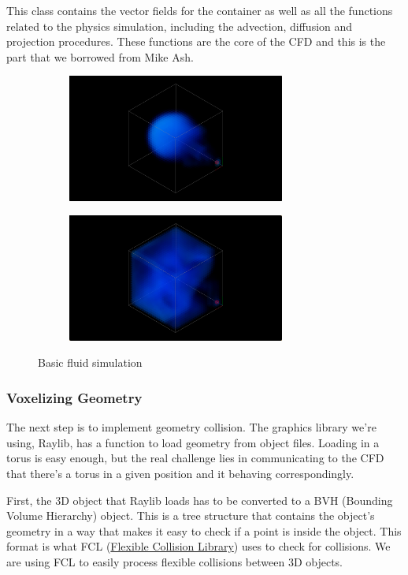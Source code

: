 \documentclass[a4paper,12pt,titlepage]{article}
\begin{document}
This class contains the vector fields for the container as well as all the
functions related to the physics simulation, including the advection, diffusion
and projection procedures. These functions are the core of the CFD and
this is the part that we borrowed from Mike Ash.

\begin{figure}[H]
    \centering
    \begin{subfigure}[t]{0.45\textwidth}
        \centering
        \includegraphics[height=1.65in]{resources/core1.png}
    \end{subfigure}
    \hfill
    \begin{subfigure}[t]{0.45\textwidth}
        \centering
        \includegraphics[height=1.65in]{resources/core2.png}
    \end{subfigure}
	\caption{Basic fluid simulation}
\end{figure}

\subsubsection{Voxelizing Geometry}
The next step is to implement geometry collision. The graphics library we're using,
Raylib, has a function to load geometry from object files. Loading in a torus is
easy enough, but the real challenge lies in communicating to the CFD that there's
a torus in a given position and it behaving correspondingly.

First, the 3D object that Raylib loads has to be converted to a BVH (Bounding Volume
Hierarchy) object. This is a tree structure that contains the object's geometry in
a way that makes it easy to check if a point is inside the object. This format
is what FCL (\href{https://github.com/flexible-collision-library/fcl}{Flexible Collision Library})
uses to check for collisions. We are using FCL to easily process flexible
collisions between 3D objects.
\end{document}
